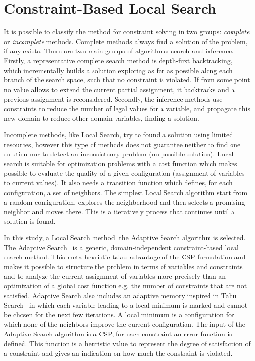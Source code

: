 \documentclass{llncs}
\begin{document}
\section{Constraint-Based Local Search}
\label{sec:CBLS}
It is possible to classify the method for constraint solving in two
groups: \emph{complete} or \emph{incomplete} methods. Complete methods
always find a solution of the problem, if any exists. There are two
main groups of algorithms: search and inference. Firstly, a
representative complete search method is depth-first backtracking,
which incrementally builds a solution exploring as far as possible
along each branch of the search space, such that no constraint is
violated. If from some point no value allows to extend the current partial
assignment, it backtracks and a previous assignment is
reconsidered. Secondly, the inference methods use constraints to
reduce the number of legal values for a variable, and propagate this
new domain to reduce other domain variables, finding a solution.

Incomplete methods, like Local Search, try to found a solution using
limited resources, however this type of methods does not guarantee
neither to find one solution nor to detect an inconsistency problem
(no possible solution). Local search is suitable for optimization
problems with a cost function which makes possible to evaluate the
quality of a given configuration (assignment of variables to current
values). It also needs a transition function which defines, for each
configuration, a set of neighbors. The simplest Local Search algorithm
start from a random configuration, explores the neighborhood and then
selects a promising neighbor and moves there. This is a iteratively
process that continues until a solution is found.

In this study, a Local Search method, the Adaptive Search algorithm is
selected. The Adaptive Search~\cite{Codognet2001,Codognet2003}
is a generic, domain-independent constraint-based local search
method. This meta-heuristic takes advantage of the CSP
formulation and makes it possible to structure the problem in terms of
variables and constraints and to analyze the current assignment of
variables more precisely than an optimization of a global cost
function e.g. the number of constraints that are not
satisfied. Adaptive Search also includes an adaptive memory inspired
in Tabu Search~\cite{Glover1997} in which each variable leading to a
local minimum is marked and cannot be chosen for the next few
iterations. A local minimum is a configuration for which none of the
neighbors improve the current configuration.  The input of the
Adaptive Search algorithm is a CSP, for each constraint an
error function is defined. This function is a heuristic value to
represent the degree of satisfaction of a constraint and gives an
indication on how much the constraint is violated.
\end{document}
